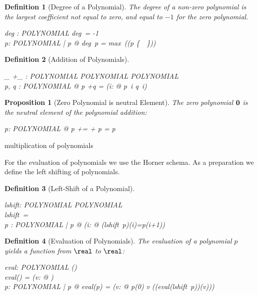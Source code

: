 \documentclass[12pt]{scrartcl}
\newtheorem{prop}{Proposition}[section]
\newtheorem{zdef}{Definition}[section]
\begin{document}
\begin{zdef}[Degree of a Polynomial]
  The degree of a non-zero polynomial is the largest coefficient not equal to
  zero, and equal to $-1$ for the zero polynomial.
  \label{zdef:degree}
  \begin{axdef}
    deg : POLYNOMIAL \fun \nat
    \where
    deg~\zeropol = -1 \\
    \forall p: POLYNOMIAL | p \neq \zeropol @ deg~p = max~(\dom (p \nrres
  \{~\azero~\}))\\
  \end{axdef}
\end{zdef}

\newcommand{\polyplus}{+}
\begin{zdef}[Addition of Polynomials]
  \label{zdef:polynomial-addition}
  \begin{axdef}
    \_ \polyplus \_ : POLYNOMIAL \cross POLYNOMIAL \fun POLYNOMIAL\\
    \where
    \forall p, q : POLYNOMIAL @ p \polyplus q = (\lambda i: \nat @ p~i
    \aplus q~i)
  \end{axdef}
\end{zdef}

\begin{prop}[Zero Polynomial is neutral Element]
  \label{prop:zero-polynomial-neutral-element}
  The zero polynomial $\mathbf{0}$ is the neutral element of the
  polynomial addition:
  \begin{zed}
    \forall p: POLYNOMIAL @ p \polyplus \zeropol = \zeropol \polyplus
    p = p
  \end{zed}
\end{prop}

 multiplication of polynomials

 For the evaluation of polynomials we use the Horner schema. As a
 preparation we define the left shifting of polynomials.
 
\begin{zdef}[Left-Shift of a Polynomial]
  \label{zdef:left-shift}
  \begin{axdef}
    lshift: POLYNOMIAL \fun POLYNOMIAL \\
    \where
    lshift~\zeropol = \zeropol\\
    \forall p : POLYNOMIAL | p \neq \zeropol @ (\forall i: \nat @ (lshift~p)(i)=p(i+1))
  \end{axdef}
\end{zdef}

\begin{zdef}[Evaluation of Polynomials]
  \label{zdef:evaluation}
  The evaluation of a polynomial $p$ yields a function from $\real$ to
  $\real$:
  \begin{axdef}
    eval: POLYNOMIAL \fun (\real \fun \real)\\
    \where
    eval(\zeropol) = (\lambda v: \real @ \azero)\\
    \forall p: POLYNOMIAL | p \neq \zeropol @ eval(p) = (\lambda v:
    \real @ p(0) \aplus v \amult ((eval(lshift~p))(v)))
  \end{axdef}
\end{zdef}
\end{document}
